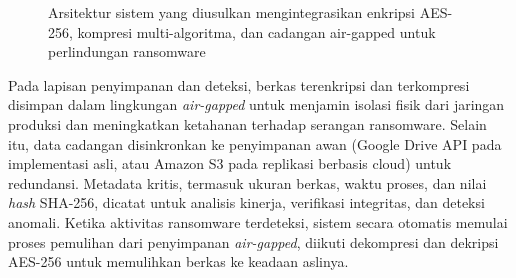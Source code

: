 \documentclass{iaesarticle}
\begin{document}
\begin{figure}[H]
\centering
{}
\vspace{.7em}
\caption{Arsitektur sistem yang diusulkan mengintegrasikan enkripsi AES-256, kompresi multi-algoritma, dan cadangan air-gapped untuk perlindungan ransomware}
\label{fig:architecture}
\end{figure}

Pada lapisan penyimpanan dan deteksi, berkas terenkripsi dan terkompresi disimpan dalam lingkungan \textit{air-gapped} untuk menjamin isolasi fisik dari jaringan produksi dan meningkatkan ketahanan terhadap serangan ransomware. Selain itu, data cadangan disinkronkan ke penyimpanan awan (Google Drive API pada implementasi asli, atau Amazon S3 pada replikasi berbasis cloud) untuk redundansi. Metadata kritis, termasuk ukuran berkas, waktu proses, dan nilai \textit{hash} SHA-256, dicatat untuk analisis kinerja, verifikasi integritas, dan deteksi anomali. Ketika aktivitas ransomware terdeteksi, sistem secara otomatis memulai proses pemulihan dari penyimpanan \textit{air-gapped}, diikuti dekompresi dan dekripsi AES-256 untuk memulihkan berkas ke keadaan aslinya.
\end{document}
